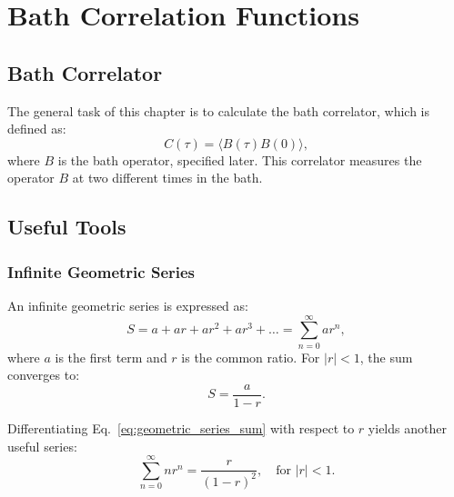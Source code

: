 \chapter{Bath Correlation Functions} %

\label{Chapter_calc_extra_stuff} %


\section{Bath Correlator}
\label{sec:bath_correlator}

The general task of this chapter is to calculate the bath correlator, which is defined as:
\begin{equation} \label{eq:bath_correlator}
	C(\tau) = \langle B(\tau) B(0) \rangle,
\end{equation}
where \( B \) is the bath operator, specified later. This correlator measures the operator \( B \) at two different times in the bath.

\section{Useful Tools}

\subsection{Infinite Geometric Series}
An infinite geometric series is expressed as:
\begin{equation} \label{eq:infinite_geometric_series}
	S = a + ar + ar^2 + ar^3 + \dots = \sum_{n=0}^{\infty} ar^n,
\end{equation}
where \(a\) is the first term and \(r\) is the common ratio. For \(|r| < 1\), the sum converges to:
\begin{equation} \label{eq:geometric_series_sum}
	S = \frac{a}{1 - r}.
\end{equation}

Differentiating Eq.~\eqref{eq:geometric_series_sum} with respect to \( r \) yields another useful series:
\begin{equation} \label{eq:derivation_geometric_sum}
	\sum_{n=0}^{\infty} n r^n = \frac{r}{(1-r)^2}, \quad \text{for } |r| < 1.
\end{equation}

